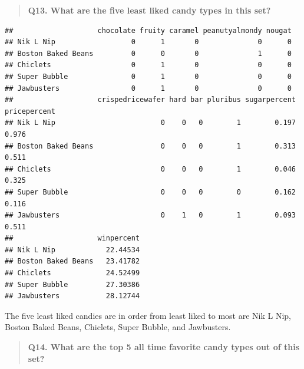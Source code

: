 \documentclass[
]{article}
\newenvironment{Shaded}{\begin{snugshade}}{\end{snugshade}}
\newcommand{\AttributeTok}[1]{\textcolor[rgb]{0.77,0.63,0.00}{#1}}
\newcommand{\ConstantTok}[1]{\textcolor[rgb]{0.00,0.00,0.00}{#1}}
\newcommand{\DecValTok}[1]{\textcolor[rgb]{0.00,0.00,0.81}{#1}}
\newcommand{\FunctionTok}[1]{\textcolor[rgb]{0.00,0.00,0.00}{#1}}
\newcommand{\NormalTok}[1]{#1}
\newcommand{\OtherTok}[1]{\textcolor[rgb]{0.56,0.35,0.01}{#1}}
\newcommand{\SpecialCharTok}[1]{\textcolor[rgb]{0.00,0.00,0.00}{#1}}
\begin{document}
\begin{quote}
\textbf{Q13. What are the five least liked candy types in this set?}
\end{quote}

\begin{Shaded}
\end{Shaded}

\begin{verbatim}
##                    chocolate fruity caramel peanutyalmondy nougat
## Nik L Nip                  0      1       0              0      0
## Boston Baked Beans         0      0       0              1      0
## Chiclets                   0      1       0              0      0
## Super Bubble               0      1       0              0      0
## Jawbusters                 0      1       0              0      0
##                    crispedricewafer hard bar pluribus sugarpercent pricepercent
## Nik L Nip                         0    0   0        1        0.197        0.976
## Boston Baked Beans                0    0   0        1        0.313        0.511
## Chiclets                          0    0   0        1        0.046        0.325
## Super Bubble                      0    0   0        0        0.162        0.116
## Jawbusters                        0    1   0        1        0.093        0.511
##                    winpercent
## Nik L Nip            22.44534
## Boston Baked Beans   23.41782
## Chiclets             24.52499
## Super Bubble         27.30386
## Jawbusters           28.12744
\end{verbatim}

The five least liked candies are in order from least liked to most are
Nik L Nip, Boston Baked Beans, Chiclets, Super Bubble, and Jawbusters.

\begin{quote}
\textbf{Q14. What are the top 5 all time favorite candy types out of
this set?}
\end{quote}

\begin{Shaded}
\end{Shaded}
\end{document}

